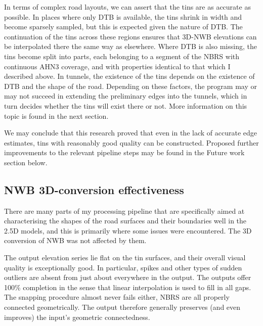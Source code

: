 In terms of complex road layouts, we can assert that the \ac{tin}s are as accurate as possible. In places where only DTB is available, the \ac{tin}s shrink in width and become sparsely sampled, but this is expected given the nature of DTB. The continuation of the \ac{tin}s across these regions ensures that 3D-NWB elevations can be interpolated there the same way as elsewhere. Where DTB is also missing, the \ac{tin}s become split into parts, each belonging to a segment of the NBRS with continuous AHN3 coverage, and with properties identical to that which I described above. In tunnels, the existence of the \ac{tin}s depends on the existence of DTB and the shape of the road. Depending on these factors, the program may or may not succeed in extending the preliminary edges into the tunnels, which in turn decides whether the \ac{tin}s will exist there or not. More information on this topic is found in the next section.

We may conclude that this research proved that even in the lack of accurate edge estimates, \ac{tin}s with reasonably good quality can be constructed. Proposed further improvements to the relevant pipeline steps may be found in the Future work section below.

\subsection{NWB 3D-conversion effectiveness}
\label{sub:effectivenessconversion}

There are many parts of my processing pipeline that are specifically aimed at characterising the shapes of the road surfaces and their boundaries well in the 2.5D models, and this is primarily where some issues were encountered. The 3D conversion of NWB was not affected by them.

The output elevation series lie flat on the \ac{tin} surfaces, and their overall visual quality is exceptionally good. In particular, spikes and other types of sudden outliers are absent from just about everywhere in the output. The outputs offer 100\% completion in the sense that linear interpolation is used to fill in all gaps. The snapping procedure almost never fails either, NBRS are all properly connected geometrically. The output therefore generally preserves (and even improves) the input's geometric connectedness.

